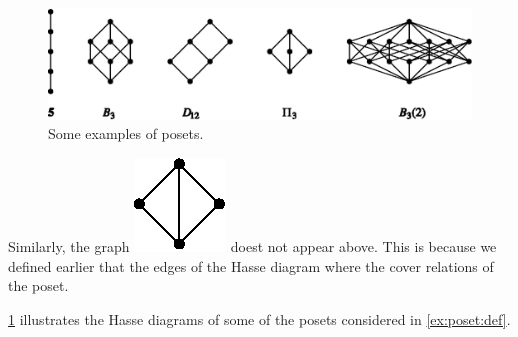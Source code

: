 \begin{figure}
	\centering
	\includegraphics[width=\textwidth]{fig/stanley/3-2}
	\caption{\label{fig:stanley:3-2} Some examples of posets. \cite{Stanley:2011:ECV:2124415}}
\end{figure}


Similarly, the graph \includegraphics{fig/stanley/3-1:b} doest not appear above. This is because we defined earlier that the edges of the Hasse diagram where the cover relations of the poset.


\ref{fig:stanley:3-2} illustrates the Hasse diagrams of some of the posets considered in \ref{ex:poset:def}. \cite{Stanley:2011:ECV:2124415}

